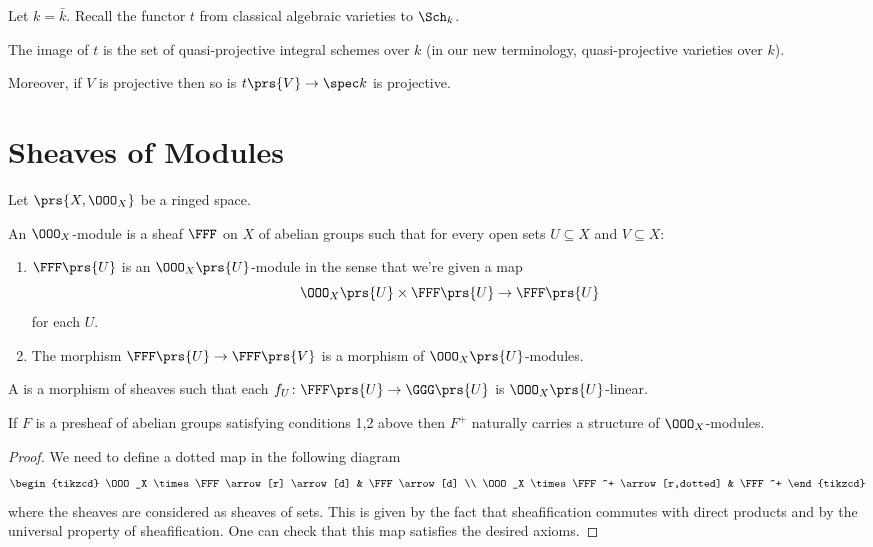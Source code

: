 \documentclass[10pt,a4paper,twoside,openany,hidelinks]{book}
\begin{document}
\begin{proposition}
Let $k = \bar{k}$. Recall the functor $t$ from classical algebraic varieties to $\Sch_k$.

The image of $t$ is the set of quasi-projective integral schemes over $k$ (in our new terminology, quasi-projective varieties over $k$).

Moreover, if $V$ is projective then so is $t\prs{V} \to \spec k$ is projective.
\end{proposition}

\chapter{Sheaves of Modules}

Let $\prs{X, \OOO_X}$ be a ringed space.

\begin{definition}
An $\OOO_X$-module is a sheaf $\FFF$ on $X$ of abelian groups such that for every open sets $U \subseteq X$ and $V \subseteq X$:
\begin{enumerate}
\item $\FFF\prs{U}$ is an $\OOO_X\prs{U}$-module in the sense that we're given a map
\[\OOO_X\prs{U} \times \FFF\prs{U} \to \FFF\prs{U}\]
for each $U$.
\item The morphism $\FFF\prs{U} \to \FFF\prs{V}$ is a morphism of $\OOO_X\prs{U}$-modules.
\end{enumerate}
\end{definition}

\begin{definition}
A  is a morphism of sheaves such that each $f_U \colon \FFF\prs{U} \to \GGG\prs{U}$ is $\OOO_X\prs{U}$-linear.
\end{definition}

\begin{lemma}
If $F$ is a presheaf of abelian groups satisfying conditions 1,2 above then $F^+$ naturally carries a structure of $\OOO_X$-modules.
\end{lemma}

\begin{proof}
We need to define a dotted map in the following diagram
\[
\begin{tikzcd}
\OOO_X \times \FFF \arrow[r] \arrow[d] & \FFF \arrow[d] \\
\OOO_X \times \FFF^+ \arrow[r,dotted] & \FFF^+
\end{tikzcd}
\]
where the sheaves are considered as sheaves of sets.
This is given by the fact that sheafification commutes with direct products and by the universal property of sheafification.
One can check that this map satisfies the desired axioms.
\end{proof}
\end{document}
